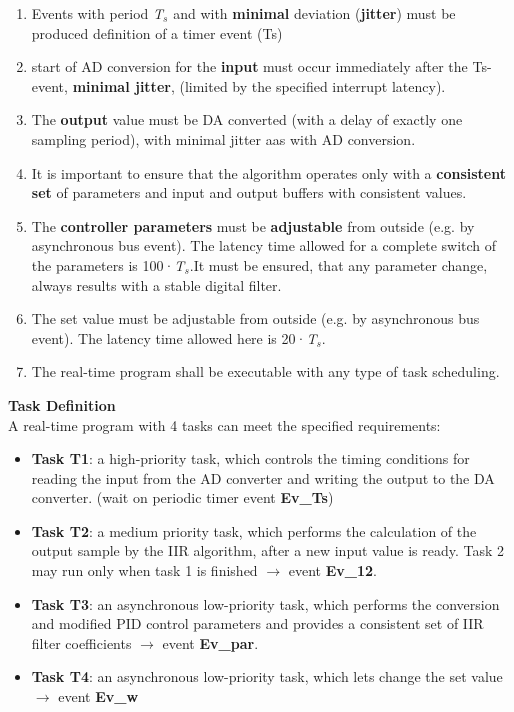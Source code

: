 \begin{enumerate}

\item  Events with period \textit{T${}_{s}$} and with \textbf{minimal} deviation (\textbf{jitter}) must be produced  definition of a timer event (Ts)

\item  start of AD conversion for the \textbf{input} must occur immediately after the Ts-event,  \textbf{minimal jitter}, (limited by the specified interrupt latency).

\item  The \textbf{output} value must be DA converted (with a delay of exactly one sampling period), with minimal jitter aas with AD conversion. 

\item  It is important to ensure that the algorithm operates only with a \textbf{consistent set} of parameters and input and output buffers with consistent values. 

\item  The \textbf{controller parameters} must be \textbf{adjustable} from outside (e.g. by asynchronous bus event). The latency time allowed for a complete switch of the parameters is 100·\textit{T${}_{s}$}.It must be ensured, that any parameter change, always results with a stable digital filter. 

\item  The set value must be adjustable from outside (e.g. by asynchronous bus event). The latency time allowed here is 20·\textit{T${}_{s}$}.

\item  The real-time program shall be executable with any type of task scheduling. 
\end{enumerate}

{\rot\bf Task Definition}\\

A real-time program with 4 tasks can meet the specified requirements:

\begin{itemize}
\item  \textbf{Task T1}: a high-priority task, which controls the timing conditions for reading the input from the AD converter and writing the output to the DA converter. (wait on periodic timer event \textbf{Ev\_Ts})

\item  \textbf{Task T2}: a medium priority task, which performs the calculation of the output sample by the IIR algorithm, after a new input value is ready. Task 2 may run only when task 1 is finished $\rightarrow$ event \textbf{Ev\_12}.

\item  \textbf{Task T3}: an asynchronous low-priority task, which performs the conversion and modified PID control parameters and provides a consistent set of IIR filter coefficients $\rightarrow$ event \textbf{Ev\_par}.

\item  \textbf{Task T4}: an asynchronous low-priority task, which lets change the set value$\rightarrow$ event \textbf{Ev\_w}
\end{itemize}

